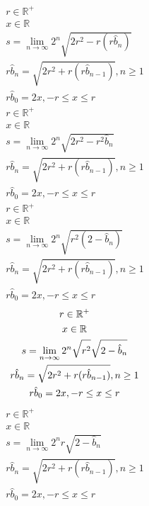 \documentclass[a4paper,12pt]{report}
\begin{document}
\begin{subequations}
\begin{gather}
r \in \mathbb{R}^+ \\
x \in \mathbb{R} \\
s = \lim \limits_{n \to \infty} 2^n \sqrt{2r^2 - r (r \hat{b}_n)} \\
r \hat{b}_n = \sqrt{2r^2 + r (r \hat{b}_{n-1})}, n \geq 1 \\
r \hat{b}_0 = 2x, -r \leq x \leq r
\end{gather}
\end{subequations}
\begin{subequations}
\begin{gather}
r \in \mathbb{R}^+ \\
x \in \mathbb{R} \\
s = \lim \limits_{n \to \infty} 2^n \sqrt{2r^2 - r^2 \hat{b}_n} \\
r \hat{b}_n = \sqrt{2r^2 + r (r \hat{b}_{n-1})}, n \geq 1 \\
r \hat{b}_0 = 2x, -r \leq x \leq r
\end{gather}
\end{subequations}
\begin{subequations}
\begin{gather}
r \in \mathbb{R}^+ \\
x \in \mathbb{R} \\
s = \lim \limits_{n \to \infty} 2^n \sqrt{r^2 (2 - \hat{b}_n)} \\
r \hat{b}_n = \sqrt{2r^2 + r (r \hat{b}_{n-1})}, n \geq 1 \\
r \hat{b}_0 = 2x, -r \leq x \leq r
\end{gather}
\end{subequations}
\begin{subequations}
\begin{gather}
r \in \mathbb{R}^+ \\
x \in \mathbb{R} \\
s = \lim \limits_{n \to \infty} 2^n \sqrt{\vphantom{2 - \hat{b}_n} r^2} \sqrt{2 - \hat{b}_n} \\
r \hat{b}_n = \sqrt{2r^2 + r (r \hat{b}_{n-1})}, n \geq 1 \\
r \hat{b}_0 = 2x, -r \leq x \leq r
\end{gather}
\end{subequations}
\begin{subequations}
\begin{gather}
r \in \mathbb{R}^+ \\
x \in \mathbb{R} \\
s = \lim \limits_{n \to \infty} 2^n r \sqrt{2 - \hat{b}_n} \\
r \hat{b}_n = \sqrt{2r^2 + r (r \hat{b}_{n-1})}, n \geq 1 \\
r \hat{b}_0 = 2x, -r \leq x \leq r
\end{gather}
\end{subequations}
\end{document}
